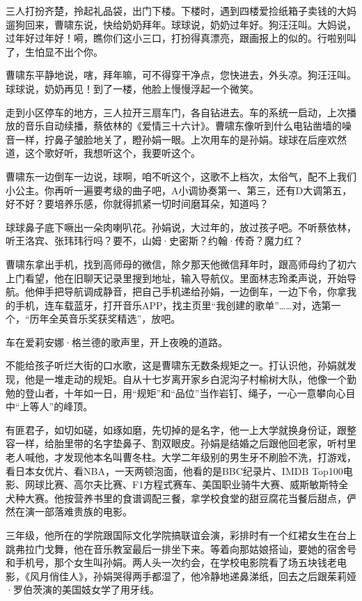 \documentclass[lang=cn,newtx,12pt,scheme=chinese]{elegantbook}
\begin{document}
三人打扮齐楚，拎起礼品袋，出门下楼。下楼时，遇到四楼爱捡纸箱子卖钱的大妈遛狗回来，曹啸东说，快给奶奶拜年。球球说，奶奶过年好。狗汪汪叫。大妈说，过年好过年好！嗬，瞧你们这小三口，打扮得真漂亮，跟画报上的似的。行啦别叫了，生怕显不出个你。

曹啸东平静地说，嗐，拜年嘛，可不得穿干净点，您快进去，外头凉。狗汪汪叫。球球说，奶奶再见！到了一楼，他脸上慢慢浮起一个微笑。

走到小区停车的地方，三人拉开三扇车门，各自钻进去。车的系统一启动，上次播放的音乐自动续播，蔡依林的《爱情三十六计》。曹啸东像听到什么电钻凿墙的噪音一样，拧鼻子皱脸地关了，瞪孙娟一眼。上次用车的是孙娟。球球在后座欢然道，这个歌好听，我想听这个，我要听这个。

曹啸东一边倒车一边说，球啊，咱不听这个，这歌不上档次，太俗气，配不上我们小公主。你再听一遍要考级的曲子吧，A小调协奏第一、第三，还有D大调第五，好不好？要培养乐感，你就得抓紧一切时间磨耳朵，知道吗？

球球鼻子底下噘出一朵肉喇叭花。孙娟说，大过年的，放过孩子吧。不听蔡依林，听王洛宾、张玮玮行吗？要不，山姆·史密斯？约翰·传奇？魔力红？

曹啸东拿出手机，找到高师母的微信，除夕那天他微信拜年时，跟高师母约了初六上门看望，他在旧聊天记录里搜到地址，输入导航仪。里面林志玲柔声说，开始导航。他伸手把导航调成静音，把自己手机递给孙娟，一边倒车，一边下令，你拿我的手机，连车载蓝牙，打开音乐APP，找主页里“我创建的歌单”……对，选第一个，“历年全英音乐奖获奖精选”，放吧。

车在爱莉安娜·格兰德的歌声里，开上夜晚的道路。

不能给孩子听烂大街的口水歌，这是曹啸东无数条规矩之一。打认识他，孙娟就发现，他是一堆走动的规矩。自从十七岁离开家乡白泥沟子村榆树大队，他像一个勤勉的登山者，十年如一日，用“规矩”和“品位”当作岩钉、绳子，一心一意攀向心目中“上等人”的峰顶。

有匪君子，如切如磋，如琢如磨，先切掉的是名字，他一上大学就换身份证，跟整容一样，给胎里带的名字垫鼻子、割双眼皮。孙娟是结婚之后跟他回老家，听村里老人喊他，才发现他本名叫曹冬柱。大学二年级别的男生牙不刷脸不洗，打游戏，看日本女优片、看NBA，一天两顿泡面，他看的是BBC纪录片、IMDB Top100电影、网球比赛、高尔夫比赛、F1方程式赛车、美国职业骑牛大赛、威斯敏斯特全犬种大赛。他按营养书里的食谱调配三餐，拿学校食堂的甜豆腐花当餐后甜点，俨然在演一部落难贵族的电影。

三年级，他所在的学院跟国际文化学院搞联谊会演，彩排时有一个红裙女生在台上跳弗拉门戈舞，他在音乐教室最后一排坐下来。等着向那姑娘搭讪，要她的宿舍号和手机号，那个女生叫孙娟。两人头一次约会，在学校电影院看了场五块钱老电影，《风月俏佳人》，孙娟哭得两手都湿了，他冷静地递鼻涕纸，回去之后跟茱莉娅·罗伯茨演的美国妓女学了用牙线。
\end{document}
